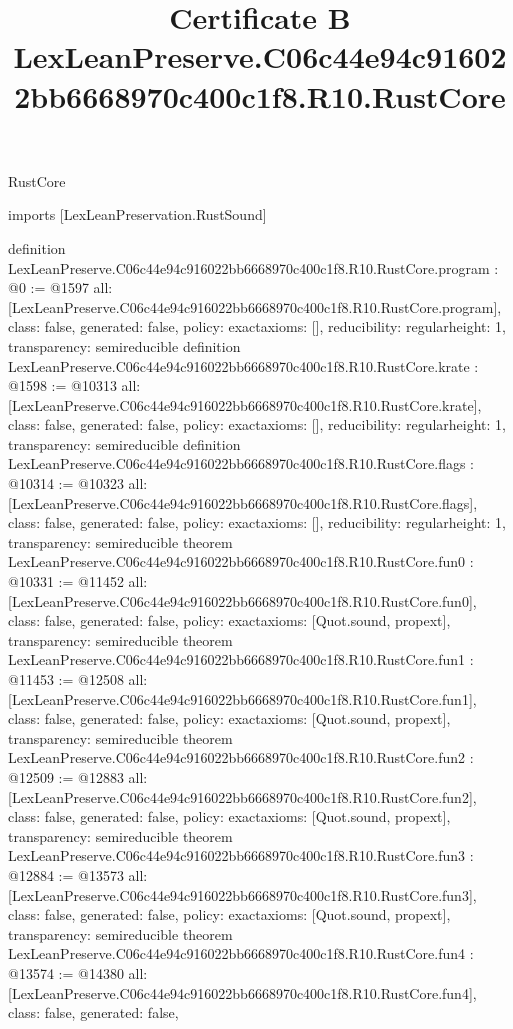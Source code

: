 \begin{lexlean}{RustCore}
\title{Certificate B LexLeanPreserve.C06c44e94c916022bb6668970c400c1f8.R10.RustCore}
\begin{coremodule}
imports [LexLeanPreservation.RustSound]

definition LexLeanPreserve.C06c44e94c916022bb6668970c400c1f8.R10.RustCore.program : @0 := @1597 {
  all: [LexLeanPreserve.C06c44e94c916022bb6668970c400c1f8.R10.RustCore.program],
  class: false,
  generated: false,
  policy: exact{axioms: []},
  reducibility: regular{height: 1},
  transparency: semireducible
}
definition LexLeanPreserve.C06c44e94c916022bb6668970c400c1f8.R10.RustCore.krate : @1598 := @10313 {
  all: [LexLeanPreserve.C06c44e94c916022bb6668970c400c1f8.R10.RustCore.krate],
  class: false,
  generated: false,
  policy: exact{axioms: []},
  reducibility: regular{height: 1},
  transparency: semireducible
}
definition LexLeanPreserve.C06c44e94c916022bb6668970c400c1f8.R10.RustCore.flags : @10314 := @10323 {
  all: [LexLeanPreserve.C06c44e94c916022bb6668970c400c1f8.R10.RustCore.flags],
  class: false,
  generated: false,
  policy: exact{axioms: []},
  reducibility: regular{height: 1},
  transparency: semireducible
}
theorem LexLeanPreserve.C06c44e94c916022bb6668970c400c1f8.R10.RustCore.fun0 : @10331 := @11452 {
  all: [LexLeanPreserve.C06c44e94c916022bb6668970c400c1f8.R10.RustCore.fun0],
  class: false,
  generated: false,
  policy: exact{axioms: [Quot.sound, propext]},
  transparency: semireducible
}
theorem LexLeanPreserve.C06c44e94c916022bb6668970c400c1f8.R10.RustCore.fun1 : @11453 := @12508 {
  all: [LexLeanPreserve.C06c44e94c916022bb6668970c400c1f8.R10.RustCore.fun1],
  class: false,
  generated: false,
  policy: exact{axioms: [Quot.sound, propext]},
  transparency: semireducible
}
theorem LexLeanPreserve.C06c44e94c916022bb6668970c400c1f8.R10.RustCore.fun2 : @12509 := @12883 {
  all: [LexLeanPreserve.C06c44e94c916022bb6668970c400c1f8.R10.RustCore.fun2],
  class: false,
  generated: false,
  policy: exact{axioms: [Quot.sound, propext]},
  transparency: semireducible
}
theorem LexLeanPreserve.C06c44e94c916022bb6668970c400c1f8.R10.RustCore.fun3 : @12884 := @13573 {
  all: [LexLeanPreserve.C06c44e94c916022bb6668970c400c1f8.R10.RustCore.fun3],
  class: false,
  generated: false,
  policy: exact{axioms: [Quot.sound, propext]},
  transparency: semireducible
}
theorem LexLeanPreserve.C06c44e94c916022bb6668970c400c1f8.R10.RustCore.fun4 : @13574 := @14380 {
  all: [LexLeanPreserve.C06c44e94c916022bb6668970c400c1f8.R10.RustCore.fun4],
  class: false,
  generated: false,
}
\end{coremodule}
\end{lexlean}
